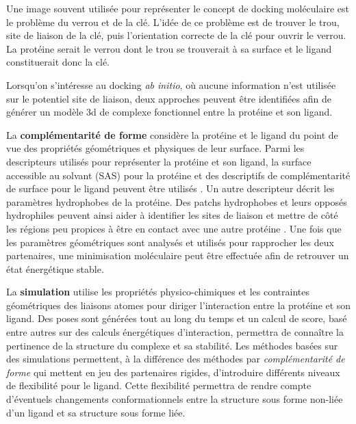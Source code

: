 Une image souvent utilisée pour représenter le concept de docking moléculaire est le problème du verrou et de la clé. L'idée de ce problème est de trouver le trou, site de liaison de la clé, puis l'orientation correcte de la clé pour ouvrir le verrou. La protéine serait le verrou dont le trou se trouverait à sa surface et le ligand constituerait donc la clé.


Lorsqu'on s'intéresse au docking \textit{ab initio}, où aucune information n'est utilisée sur le potentiel site de liaison, deux approches peuvent être identifiées afin de générer un modèle 3d de complexe fonctionnel entre la protéine et son ligand.

La \textbf{complémentarité de forme} considère la protéine et le ligand du point de vue des propriétés géométriques et physiques de leur surface. Parmi les descripteurs utilisés pour représenter la protéine et son ligand, la surface accessible au solvant (SAS) pour la protéine et des descriptifs de complémentarité de surface pour le ligand peuvent être utilisés \cite{shoichet1992molecular}. Un autre descripteur décrit les paramètres hydrophobes de la protéine. Des patchs hydrophobes et leurs opposés hydrophiles peuvent ainsi aider à identifier les sites de liaison et mettre de côté les régions peu propices à être en contact avec une autre protéine \cite{jones1996principles}. Une fois que les paramètres géométriques sont analysés et utilisés pour rapprocher les deux partenaires, une minimisation moléculaire peut être effectuée afin de retrouver un état énergétique stable.

La \textbf{simulation} utilise les propriétés physico-chimiques et les contraintes géométriques des liaisons atomes pour diriger l'interaction entre la protéine et son ligand. Des poses sont générées tout au long du temps et un calcul de score, basé entre autres sur des calculs énergétiques d'interaction, permettra de connaître la pertinence de la structure du complexe et sa stabilité. Les méthodes basées sur des simulations permettent, à la différence des méthodes par \textit{complémentarité de forme} qui mettent en jeu des partenaires rigides, d'introduire différents niveaux de flexibilité pour le ligand. Cette flexibilité permettra de rendre compte d'éventuels changements conformationnels entre la structure sous forme non-liée d'un ligand et sa structure sous forme liée.

